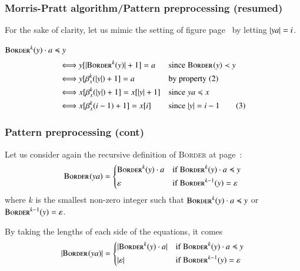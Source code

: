 %
\begin{frame}
\frametitle{Morris-Pratt algorithm/Pattern preprocessing (resumed)}

For the sake of clarity, let us mimic the setting of
figure page~\pageref{morris-pratt-conf} by letting \(\lvert{ya}\lvert{}=i\).

\bigskip

\(\textsc{Border}^{k}(y) \cdot a \preccurlyeq y\)
\begin{align*}
&\Longleftrightarrow y [\lvert{\textsc{Border}^{k}(y)}\lvert{} + 1] = a
&& \text{since} \; \textsc{Border}^{}(y) \prec y\\
&\Longleftrightarrow y [\beta_{x}^{k}(\lvert{y}\lvert{}) + 1] = a
&& \text{by property} \; (2)\\
&\Longleftrightarrow x [\beta_{x}^{k}(\lvert{y}\lvert{}) + 1] = x [\lvert{y}\lvert{} + 1]
&& \text{since} \; ya \preccurlyeq x\\
&\Longleftrightarrow x [\beta_{x}^{k}(i-1) + 1] = x [i]
&& \text{since} \; \lvert{y}\lvert{} = i - 1 \tag{3}
\end{align*}

\end{frame}

%
\begin{frame}
\frametitle{Pattern preprocessing (cont)}

Let us consider again the recursive definition of \textsc{Border} at
page~\pageref{border_def}:
\[
\textsc{Border}^{}(ya) =
\left\{
  \begin{aligned}
   & \textsc{Border}^{k}(y) \cdot a
   && \text{if} \; \textsc{Border}^{k}(y) \cdot a \preccurlyeq y\\
   & \varepsilon
   && \text{if} \; \textsc{Border}^{k-1}(y) = \varepsilon
  \end{aligned}
\right.
\]
where \(k\) is the smallest non-zero integer such that \(\textsc{Border}^{k}(y)
\cdot a \preccurlyeq y\) or \(\textsc{Border}^{k-1}(y) = \varepsilon\).

\bigskip

By taking the lengths of each side of the equations, it comes
\[
\lvert{\textsc{Border}^{}(ya)}\lvert{} =
\left\{
  \begin{aligned}
   & \lvert{\textsc{Border}^{k}(y) \cdot a }\lvert{}
   && \text{if} \; \textsc{Border}^{k}(y) \cdot a \preccurlyeq y\\
   & \lvert{\varepsilon}\lvert{}
   && \text{if} \; \textsc{Border}^{k-1}(y) = \varepsilon
  \end{aligned}
\right.
\]

\end{frame}

